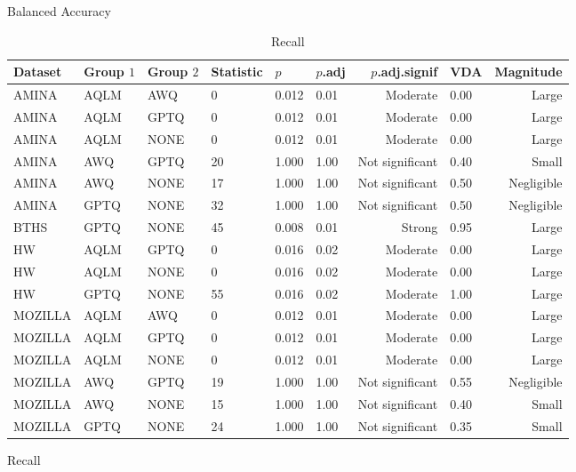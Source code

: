 \begin{table}[ht]
\centering
\tiny

\begin{subtable}[t]{0.47\textwidth}
    \centering
    \caption{Balanced Accuracy}
    \begin{tabular}{llllllrlr}
    \toprule
    Dataset & Group $1$ & Group $2$ & Statistic & $p$ & $p$.adj & $p$.adj.signif & VDA & Magnitude \\
    \midrule
    AMINA & AQLM & AWQ & 0 & 0.012 & 0.01 & Moderate & 0.00 & Large \\
    AMINA & AQLM & GPTQ & 0 & 0.012 & 0.01 & Moderate & 0.00 & Large \\
    AMINA & AQLM & NONE & 0 & 0.012 & 0.01 & Moderate & 0.00 & Large \\
    AMINA & AWQ & GPTQ & 20 & 1.000 & 1.00 & Not significant & 0.40 & Small \\
    AMINA & AWQ & NONE & 17 & 1.000 & 1.00 & Not significant & 0.50 & Negligible \\
    AMINA & GPTQ & NONE & 32 & 1.000 & 1.00 & Not significant & 0.50 & Negligible \\
    BTHS & GPTQ & NONE & 45 & 0.008 & 0.01 & Strong & 0.95 & Large \\
    HW & AQLM & GPTQ & 0 & 0.016 & 0.02 & Moderate & 0.00 & Large \\
    HW & AQLM & NONE & 0 & 0.016 & 0.02 & Moderate & 0.00 & Large \\
    HW & GPTQ & NONE & 55 & 0.016 & 0.02 & Moderate & 1.00 & Large \\
    MOZILLA & AQLM & AWQ & 0 & 0.012 & 0.01 & Moderate & 0.00 & Large \\
    MOZILLA & AQLM & GPTQ & 0 & 0.012 & 0.01 & Moderate & 0.00 & Large \\
    MOZILLA & AQLM & NONE & 0 & 0.012 & 0.01 & Moderate & 0.00 & Large \\
    MOZILLA & AWQ & GPTQ & 19 & 1.000 & 1.00 & Not significant & 0.55 & Negligible \\
    MOZILLA & AWQ & NONE & 15 & 1.000 & 1.00 & Not significant & 0.40 & Small \\
    MOZILLA & GPTQ & NONE & 24 & 1.000 & 1.00 & Not significant & 0.35 & Small \\
    \bottomrule
    \end{tabular}
\end{subtable}
\hfill
\begin{subtable}[t]{0.47\textwidth}
    \centering
    \caption{Recall}
    \begin{tabular}{llllllrlr}

\end{tabular}
\end{subtable}
\end{table}
